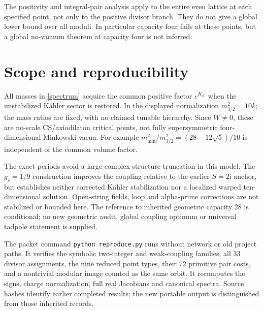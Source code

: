 \documentclass[11pt]{article}
\newcommand{\ii}{\mathrm{i}}
\begin{document}
The positivity and integral-pair analysis apply to the entire even lattice
at each specified point, not only to the positive divisor branch. They do
not give a global lower bound over all moduli. In particular capacity four
fails at these points, but a global no-vacuum theorem at capacity four is
not inferred.

\section{Scope and reproducibility}
All masses in \eqref{spectrum} acquire the common positive factor
$e^{K_K}$ when the unstabilized K\"ahler sector is restored. In the displayed
normalization $m_{3/2}^2=10k$; the mass ratios are fixed, with no claimed
tunable hierarchy. Since $W\ne0$, these are no-scale CS/axiodilaton critical
points, not fully supersymmetric four-dimensional Minkowski vacua.
For example $m_{\min}^2/m_{3/2}^2=(28-12\sqrt5)/10$ is independent of the
common volume factor.

The exact periods avoid a large-complex-structure truncation in this model.
The $g_s=1/9$ construction improves the coupling relative to the earlier
$S=2\ii$ anchor, but establishes neither corrected K\"ahler stabilization nor
a localized warped ten-dimensional solution. Open-string fields, loop and
alpha-prime corrections are not stabilized or bounded here. The reference
to inherited geometric capacity 28 is conditional; no new geometric audit,
global coupling optimum or universal tadpole statement is supplied.

The packet command \texttt{python reproduce.py} runs without network or old
project paths. It verifies the symbolic two-integer and weak-coupling
families, all 33 divisor assignments, the nine reduced point types, their
72 primitive pair costs, and a nontrivial modular image counted as the same
orbit. It recomputes the signs, charge normalization, full real Jacobians
and canonical spectra. Source hashes identify earlier completed results;
the new portable output is distinguished from those inherited records.

\appendix
\end{document}
